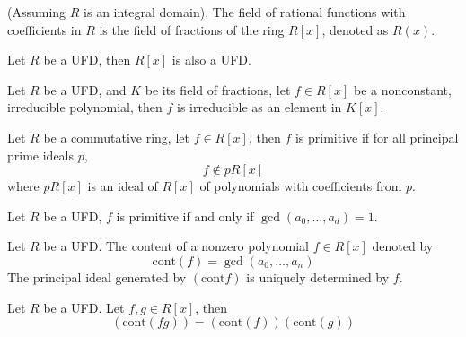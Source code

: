 \documentclass[openany]{book}
\begin{document}
\begin{defn}
    (Assuming $R$ is an integral domain). The field of rational functions with coefficients in $R$ is the field of fractions of the ring $R[x]$, denoted as $R(x)$.
\end{defn}











\begin{thm}
    Let $R$ be a UFD, then $R[x]$ is also a UFD.
\end{thm}

\begin{prop}
    Let $R$ be a UFD, and $K$ be its field of fractions, let $f\in R[x]$ be a nonconstant, irreducible polynomial, then $f$ is irreducible as an element in $K[x]$.
\end{prop}



\begin{defn}
    Let $R$ be a commutative ring, let $f\in R[x]$, then $f$ is primitive if for all principal prime ideals $p$, 
    \begin{equation*}
        f\not\in pR[x]
    \end{equation*}
    where $pR[x]$ is an ideal of $R[x]$ of polynomials with coefficients from $p$.
\end{defn}

\begin{prop}[*]
    Let $R$ be a UFD, $f$ is primitive if and only if $\gcd(a_0,\dots, a_d)=1$.
\end{prop}

\begin{defn}
    Let $R$ be a UFD.
    The content of a nonzero polynomial $f\in R[x]$ denoted by 
    \begin{equation*}
        \text{cont}(f)=\gcd(a_0,\dots,a_n)
    \end{equation*}
    The principal ideal generated by $(\text{cont}f)$ is uniquely determined by $f$.
\end{defn}

\begin{prop}
    Let $R$ be a UFD. Let $f,g\in R[x]$, then 
    \begin{equation*}
        (\text{cont}(fg))=(\text{cont}(f))(\text{cont}(g))
    \end{equation*}
\end{prop}
\end{document}
